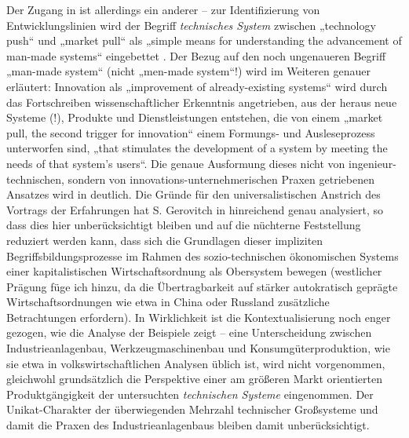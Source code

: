 \documentclass[11pt,a4paper]{article}
\begin{document}
Der Zugang in \cite{TESE2018} ist allerdings ein anderer -- zur
Identifizierung von Entwicklungslinien wird der Begriff \emph{technisches
  System} zwischen „technology push“ und „market pull“ als „simple means for
understanding the advancement of man-made systems“ eingebettet
\cite[S. 1]{TESE2018}. Der Bezug auf den noch ungenaueren Begriff „man-made
system“ (nicht „men-made system“!) wird im Weiteren genauer erläutert:
Innovation als „improvement of already-existing systems“ wird durch das
Fortschreiben wissenschaftlicher Erkenntnis angetrieben, aus der heraus neue
Systeme (!), Produkte und Dienstleistungen entstehen, die von einem „market
pull, the second trigger for innovation“ einem Formungs- und Ausleseprozess
unterworfen sind, „that stimulates the development of a system by meeting the
needs of that system's users“.  Die genaue Ausformung dieses nicht von
ingenieur-technischen, sondern von innovations-unternehmerischen Praxen
getriebenen Ansatzes wird in \cite[Kap. 3]{TESE2018} deutlich.  Die Gründe für
den universalistischen Anstrich des Vortrags der Erfahrungen hat S. Gerovitch
in \cite{Gerovitch1996} hinreichend genau analysiert, so dass dies hier
unberücksichtigt bleiben und auf die nüchterne Feststellung reduziert werden
kann, dass sich die Grundlagen dieser impliziten Begriffsbildungsprozesse im
Rahmen des sozio-technischen ökonomischen Systems einer kapitalistischen
Wirtschaftsordnung als Obersystem bewegen (westlicher Prägung füge ich hinzu,
da die Übertragbarkeit auf stärker autokratisch geprägte Wirtschaftsordnungen
wie etwa in China oder Russland zusätzliche Betrachtungen erfordern).  In
Wirklichkeit ist die Kontextualisierung noch enger gezogen, wie die Analyse
der Beispiele zeigt -- eine Unterscheidung zwischen Industrieanlagenbau,
Werkzeugmaschinenbau und Konsumgüterproduktion, wie sie etwa in
volkswirtschaftlichen Analysen üblich ist, wird nicht vorgenommen, gleichwohl
grundsätzlich die Perspektive einer am größeren Markt orientierten
Produktgängigkeit der untersuchten \emph{technischen Systeme} eingenommen.
Der Unikat-Charakter der überwiegenden Mehrzahl technischer Großsysteme und
damit die Praxen des Industrieanlagenbaus bleiben damit unberücksichtigt.
\end{document}
